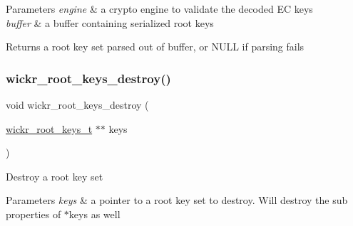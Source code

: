 \begin{DoxyParams}{Parameters}
{\em engine} & a crypto engine to validate the decoded EC keys \\
\hline
{\em buffer} & a buffer containing serialized root keys \\
\hline
\end{DoxyParams}
\begin{DoxyReturn}{Returns}
a root key set parsed out of buffer, or N\+U\+LL if parsing fails 
\end{DoxyReturn}
\mbox{\label{group__wickr__root__keys_gacabc33b7c56cbc84a5085d0a4330694f}} 
\subsubsection{\texorpdfstring{wickr\+\_\+root\+\_\+keys\+\_\+destroy()}{wickr\_root\_keys\_destroy()}}
{\footnotesize\ttfamily void wickr\+\_\+root\+\_\+keys\+\_\+destroy (\begin{DoxyParamCaption}\item[{\mbox{\hyperlink{structwickr__root__keys}{wickr\+\_\+root\+\_\+keys\+\_\+t}} $\ast$$\ast$}]{keys }\end{DoxyParamCaption})}

Destroy a root key set


\begin{DoxyParams}{Parameters}
{\em keys} & a pointer to a root key set to destroy. Will destroy the sub properties of \textquotesingle{}$\ast$keys\textquotesingle{} as well \\
\hline
\end{DoxyParams}
\mbox{\label{group__wickr__root__keys_ga6e3a04e7e1c65ada93450051eb4f4459}} 
